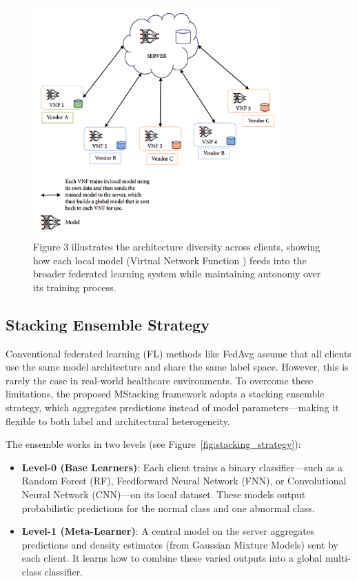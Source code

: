 \begin{figure}[h]
    \centering
    \includegraphics[width=0.85\textwidth]{./Figures/fig3.png}
    \caption{Figure 3 illustrates the architecture diversity across clients, showing how each local model (Virtual Network Function ) feeds into the broader federated learning system while maintaining autonomy over its training process.}
    \label{fig:local_models}
\end{figure}

\subsection{Stacking Ensemble Strategy}
\label{sec:stacking_ensemble_strategy}

Conventional federated learning (FL) methods like FedAvg assume that all clients use the same model architecture and share the same label space. However, this is rarely the case in real-world healthcare environments. To overcome these limitations, the proposed MStacking framework adopts a stacking ensemble strategy, which aggregates predictions instead of model parameters—making it flexible to both label and architectural heterogeneity.

The ensemble works in two levels (see Figure~\ref{fig:stacking_strategy}):

\begin{itemize}
    \item \textbf{Level-0 (Base Learners)}: Each client trains a binary classifier—such as a Random Forest (RF), Feedforward Neural Network (FNN), or Convolutional Neural Network (CNN)—on its local dataset. These models output probabilistic predictions for the normal class and one abnormal class.
    
    \item \textbf{Level-1 (Meta-Learner)}: A central model on the server aggregates predictions and density estimates (from Gaussian Mixture Models) sent by each client. It learns how to combine these varied outputs into a global multi-class classifier.
\end{itemize}

